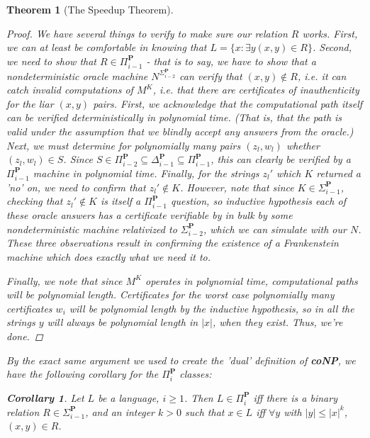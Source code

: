 \documentclass{article}
\theoremstyle{definition}
\theoremstyle{plain}
\theoremstyle{theorem}
\newtheorem{theorem}{Theorem}[section]
\newtheorem{corollary}{Corollary}[section]
\begin{document}
\begin{theorem}[The Speedup Theorem]
\begin{proof}
    \par We have several things to verify to make sure our relation $R$ works. First, we can at least be comfortable in knowing that $L = \{x: \exists y (x,y) \in R \}$. Second, we need to show that $R \in \Pi_{i-1}^{\textbf{P}}$ - that is to say, we have to show that a nondeterministic oracle machine $N^{\Sigma_{i-2}^{\textbf{P}}}$ can verify that $(x,y) \notin R$, i.e. it can catch invalid computations of $M^K$, i.e. that there are certificates of inauthenticity for the liar $(x,y)$ pairs. First, we acknowledge that the computational path itself can be verified deterministically in polynomial time. (That is, that the path is valid under the assumption that we blindly accept any answers from the oracle.) Next, we must determine for polynomially many pairs $(z_l,w_l)$ whether $(z_l,w_l) \in S$. Since $S \in \Pi_{i-2}^{\textbf{P}} \subseteq \Delta_{i-1}^{\textbf{P}} \subseteq \Pi_{i-1}^{\textbf{P}}$, this can clearly be verified by a $\Pi_{i-1}^{\textbf{P}}$ machine in polynomial time. Finally, for the strings $z_l'$ which $K$ returned a 'no' on, we need to confirm that $z_l' \notin K$. However, note that since $K \in \Sigma_{i-1}^{\textbf{P}}$, checking that $z_l' \notin K$ is itself a $\Pi_{i-1}^{\textbf{P}}$ question, so inductive hypothesis each of these oracle answers has a certificate verifiable by in bulk by some nondeterministic machine relativized to $\Sigma_{i-2}^{\textbf{P}}$, which we can simulate with our $N$. These three observations result in confirming the existence of a Frankenstein machine which does exactly what we need it to.
    \par Finally, we note that since $M^K$ operates in polynomial time, computational paths will be polynomial length. Certificates for the worst case polynomially many certificates $w_i$ will be polynomial length by the inductive hypothesis, so in all the strings $y$ will always be polynomial length in $|x|$, when they exist. Thus, we're done.
\end{proof}
By the exact same argument we used to create the 'dual' definition of \textbf{coNP}, we have the following corollary for the $\Pi_i^{\textbf{P}}$ classes:
\begin{corollary}
    Let $L$ be a language, $i \geq 1$. Then $L \in \Pi_i^{\textbf{P}}$ iff there is a binary relation $R \in \Sigma_{i-1}^{\textbf{P}}$, and an integer $k>0$ such that $x \in L$ iff $\forall y$ with $|y| \leq |x|^k$, $(x,y) \in R$. 
\end{corollary}

\end{theorem}
\end{document}
